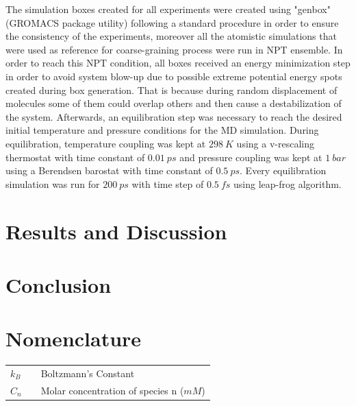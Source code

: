 \documentclass[10pt,a4paper,twoside]{article}
\begin{document}
The simulation boxes created for all  experiments were created using "genbox" (GROMACS package utility) following a standard procedure in order to ensure the consistency of the experiments, moreover all the atomistic simulations that were used as reference for coarse-graining process were run in NPT ensemble. In order to reach this NPT condition, all boxes received an energy minimization step in order to avoid system blow-up due to possible extreme potential energy spots created during box generation. That is because during random displacement of molecules some of them could overlap others and then cause a destabilization of the system. Afterwards, an equilibration step was necessary to reach the desired initial temperature and pressure conditions for the MD simulation. During equilibration, temperature coupling was kept at $298\ K$ using a v-rescaling thermostat \cite{vtstat} with time constant of $0.01\ ps$ and pressure coupling was kept at $1\ bar$ using a Berendsen barostat \cite{berend} with time constant of $0.5\ ps$.  Every equilibration simulation was run for $200\ ps$ with time step of $0.5\ fs$ using leap-frog algorithm.

%
%
%
%
\section{Results and Discussion}
\section{Conclusion} 
\section{Nomenclature} 
   \begin{tabulary}{1.0\textwidth}{LCL}
   $k_B$ & & Boltzmann's Constant\\
   $C_n$ &   & Molar concentration of species n ($mM$) \\
   \end{tabulary}


\vfill
\newpage
\end{document}
